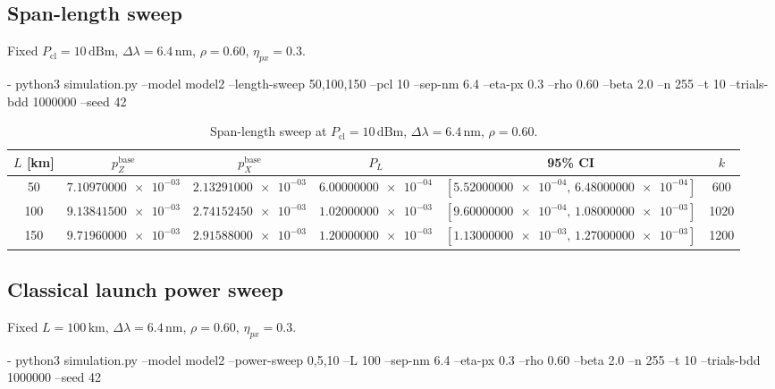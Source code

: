 \documentclass[conference]{IEEEtran}
\newcommand{\nexact}[1]{\num[round-mode=off]{#1}}
\newcommand{\simL}{100}
\newcommand{\simpcl}{10}
\newcommand{\simsep}{6.4}
\newcommand{\simeta}{0.3}
\newcommand{\simn}{255}
\newcommand{\simt}{10}
\newcommand{\simtrials}{1000000}
\newcommand{\simseed}{42}
\newcommand{\simpz}{9.13841500e-03}
\newcommand{\simpx}{2.74152450e-03}
\newcommand{\simrhoB}{0.60}
\newcommand{\simpLB}{1.02000000e-03}
\newcommand{\simpLBlo}{9.60000000e-04}
\newcommand{\simpLBhi}{1.08000000e-03}
\newcommand{\simkB}{1020}
\newcommand{\simLfa}{50}
\newcommand{\simpzLfa}{7.10970000e-03}
\newcommand{\simpxLfa}{2.13291000e-03}
\newcommand{\simpLLfa}{6.00000000e-04}
\newcommand{\simpLLfalo}{5.52000000e-04}
\newcommand{\simpLLfahi}{6.48000000e-04}
\newcommand{\simkLfa}{600}
\newcommand{\simLfb}{150}
\newcommand{\simpzLfb}{9.71960000e-03}
\newcommand{\simpxLfb}{2.91588000e-03}
\newcommand{\simpLLfb}{1.20000000e-03}
\newcommand{\simpLLfblo}{1.13000000e-03}
\newcommand{\simpLLfbhi}{1.27000000e-03}
\newcommand{\simkLfb}{1200}
\newcommand{\simpclA}{0}
\newcommand{\simpclB}{5}
\newcommand{\simpclC}{10}
\begin{document}
\subsection{Span-length sweep}
Fixed \(P_{\mathrm{cl}}=\simpcl\,\mathrm{dBm}\), \(\Delta\lambda=\simsep\,\mathrm{nm}\), \(\rho=\simrhoB\), \(\eta_{px}=\simeta\).

- python3 simulation.py --model model2 --length-sweep \simLfa{},\simL{},\simLfb{} --pcl \simpcl{} --sep-nm \simsep{} --eta-px \simeta{} --rho \simrhoB{} --beta 2.0 --n \simn{} --t \simt{} --trials-bdd \simtrials{} --seed \simseed

\begin{table}[t!]
\small
\centering
\caption{Span-length sweep at \(P_{\mathrm{cl}}=\simpcl\,\mathrm{dBm}\), \(\Delta\lambda=\simsep\,\mathrm{nm}\), \(\rho=\simrhoB\).}
\label{tab:length}
\begin{adjustbox}{width=\linewidth}
\begin{tabular}{cccccc}
\toprule
\(L\) [km] & \(p_Z^{\text{base}}\) & \(p_X^{\text{base}}\) & \(P_L\) & 95\% CI & \(k\) \\
\midrule
\simLfa & \(\nexact{\simpzLfa}\) & \(\nexact{\simpxLfa}\) & \(\nexact{\simpLLfa}\) & \([\nexact{\simpLLfalo},\,\nexact{\simpLLfahi}]\) & \simkLfa \\
\simL & \(\nexact{\simpz}\) & \(\nexact{\simpx}\) & \(\nexact{\simpLB}\) & \([\nexact{\simpLBlo},\,\nexact{\simpLBhi}]\) & \simkB \\
\simLfb & \(\nexact{\simpzLfb}\) & \(\nexact{\simpxLfb}\) & \(\nexact{\simpLLfb}\) & \([\nexact{\simpLLfblo},\,\nexact{\simpLLfbhi}]\) & \simkLfb \\
\bottomrule
\end{tabular}
\end{adjustbox}
\end{table}

\subsection{Classical launch power sweep}
Fixed \(L=\simL\,\mathrm{km}\), \(\Delta\lambda=\simsep\,\mathrm{nm}\), \(\rho=\simrhoB\), \(\eta_{px}=\simeta\).

- python3 simulation.py --model model2 --power-sweep \simpclA{},\simpclB{},\simpclC{} --L \simL{} --sep-nm \simsep{} --eta-px \simeta{} --rho \simrhoB{} --beta 2.0 --n \simn{} --t \simt{} --trials-bdd \simtrials{} --seed \simseed
\end{document}
